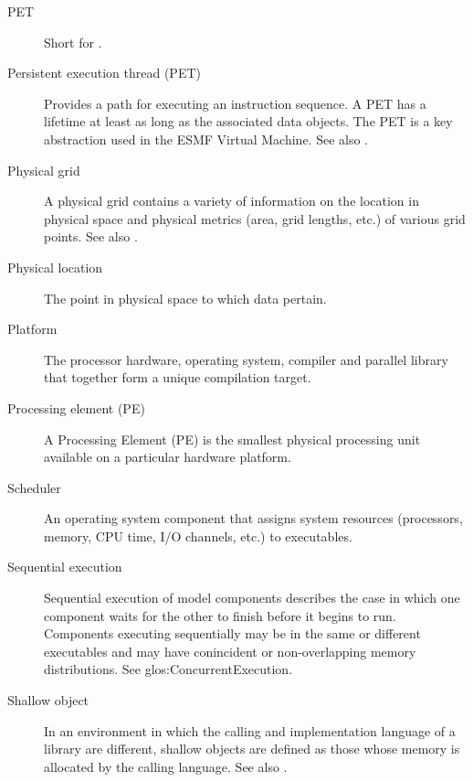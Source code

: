 \begin{description}
\item[PET] \label{glos:PET} Short for 
  .

\item[Persistent execution thread (PET)] \label{glos:PermET} Provides a
  path for executing an instruction sequence. A PET has a lifetime at least 
  as long as the associated data objects. The PET is a key abstraction 
  used in the ESMF Virtual Machine. See also  
  .

\item[Physical grid] \label{term:PhysGrid} 
  A physical grid contains a variety of information on the location 
  in physical space and physical metrics (area, grid lengths, etc.) 
  of various grid points. See also .  

\item[Physical location] \label{glos:PhysLoc} The point in physical space 
  to which data pertain. 

\item[Platform] \label{glos:Platform} 
  The processor hardware, operating system, compiler and
  parallel library that together form a unique compilation target.

\item[Processing element (PE)] \label{glos:Processing_Element}
  A Processing Element (PE) is the smallest physical processing unit available
  on a particular hardware platform.

\item[Scheduler] \label{glos:Scheduler} An operating system component 
  that assigns system resources (processors, memory, CPU time, 
  I/O channels, etc.) to executables.

\item[Sequential execution] \label{glos:SequentialExecution}
  Sequential execution of model components describes the case in which 
  one component waits for the other to finish before it begins
  to run.  Components executing sequentially may be in the same or 
  different executables and may have conincident or non-overlapping 
  memory distributions.  See 
  {glos:ConcurrentExecution}.

\item[Shallow object] \label{glos:ShallowObjects} In an environment
  in which the calling and implementation language of a library are
  different, shallow objects are defined as those whose memory is 
  allocated by the calling language. 
  See also .


\end{description}
